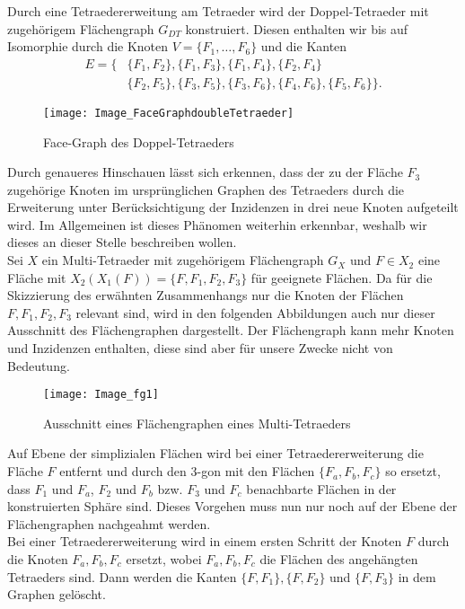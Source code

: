 \documentclass[12pt,titlepage,twoside,cleardoublepage]{article}
\theoremstyle{nummermitklammern}
\numberwithin{equation}{section}
\begin{document}
Durch eine Tetraedererweitung am Tetraeder wird der Doppel-Tetraeder mit zugehörigem Flächengraph $G_{DT}$ konstruiert. Diesen enthalten wir bis auf Isomorphie durch die Knoten $V=\{F_1,\ldots,F_6\}$ und die Kanten 
\begin{align*}
E=\{&\{F_1,F_2\},\{F_1,F_3\},\{F_1,F_4\},\{F_2,F_4\}\\
&\{F_2,F_5\},\{F_3,F_5\},\{F_3,F_6\},\{F_4,F_6\},\{F_5,F_6\}\}.
\end{align*}
\begin{figure}[H]
\begin{center}
\texttt{[image: Image\_FaceGraphdoubleTetraeder]}
\end{center}
\caption{Face-Graph des Doppel-Tetraeders}
\end{figure}
Durch genaueres Hinschauen lässt sich erkennen, dass der zu der Fläche $F_3$ zugehörige Knoten im ursprünglichen Graphen des Tetraeders durch die Erweiterung unter Berücksichtigung der Inzidenzen in drei neue Knoten aufgeteilt wird. Im Allgemeinen ist dieses Phänomen weiterhin erkennbar, weshalb wir dieses an dieser Stelle beschreiben wollen.\\
Sei $X$ ein Multi-Tetraeder mit zugehörigem Flächengraph $G_X$ und $F\in X_2$ eine Fläche mit $X_2(X_1(F))=\{F,F_1,F_2,F_3\}$ für geeignete Flächen. 
Da für die Skizzierung des erwähnten Zusammenhangs nur die Knoten der Flächen $F,F_1,F_2,F_3$ relevant sind, wird in den folgenden Abbildungen auch nur dieser Ausschnitt des Flächengraphen dargestellt. Der Flächengraph kann mehr Knoten und Inzidenzen enthalten, diese sind aber für unsere Zwecke nicht von Bedeutung.
\begin{figure}[H]
\begin{center}
\texttt{[image: Image\_fg1]}
\end{center}
\caption{Ausschnitt eines Flächengraphen eines Multi-Tetraeders}
\end{figure}
Auf Ebene der simplizialen Flächen wird bei einer Tetraedererweiterung die Fläche $F$ entfernt und durch den 3-gon mit den Flächen $\{F_a,F_b,F_c\}$ so ersetzt, dass $F_1$ und $F_a$, $F_2$ und $F_b$ bzw. $F_3$ und $F_c$ benachbarte Flächen in der konstruierten Sphäre sind. Dieses Vorgehen muss nun nur noch auf der Ebene der Flächengraphen nachgeahmt werden.\\
Bei einer Tetraedererweiterung wird in einem ersten Schritt der Knoten $F$ durch die Knoten $F_a,F_b,F_c$ ersetzt, wobei $F_a,F_b,F_c$ die Flächen des angehängten Tetraeders sind. Dann werden die Kanten $\{F,F_1\},\{F,F_2\}$ und $\{F,F_3\}$ in dem Graphen gelöscht.
\end{document}
